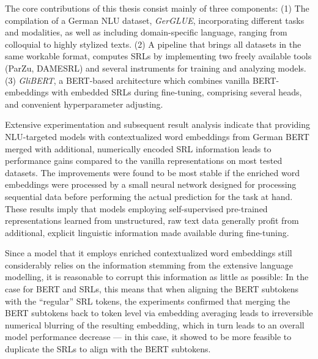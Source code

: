 \label{chap:6_conclusion}



The core contributions of this thesis consist mainly of three components: (1)
The compilation of a German NLU dataset, \emph{GerGLUE}, incorporating different
tasks and modalities, as well as including domain-specific language, ranging from
colloquial to highly stylized texts. (2) A pipeline that brings all datasets in
the same workable format, computes SRLs by implementing two freely available tools
(ParZu, DAMESRL) and several instruments for training and analyzing models. (3)
\emph{GliBERT}, a BERT-based architecture which combines vanilla BERT-embeddings
with embedded SRLs during fine-tuning, comprising several heads, and convenient
hyperparameter adjusting.

Extensive experimentation and subsequent result analysis indicate that providing NLU-targeted
models with contextualized word embeddings from German BERT merged with additional, numerically
encoded SRL information leads to performance gains compared to the vanilla representations on
most tested datasets. The improvements were found to be most stable if the enriched word
embeddings were processed by a small neural network designed for processing sequential data
before performing the actual prediction for the task at hand. These results imply that models
employing self-supervised pre-trained representations learned from unstructured, raw text
data generally profit from additional, explicit linguistic information made available during
fine-tuning.

Since a model that it employs enriched contextualized word embeddings still considerably relies on
the information stemming from the extensive language modelling, it is reasonable to corrupt this
information as little as possible: In the case for BERT and SRLs, this means that when aligning the
BERT subtokens with the ``regular'' SRL tokens, the experiments confirmed that merging the BERT
subtokens back to token level via embedding averaging leads to irreversible numerical blurring of
the resulting embedding, which in turn leads to an overall model performance decrease --- in this
case, it showed to be more feasible to duplicate the SRLs to align with the BERT subtokens.

